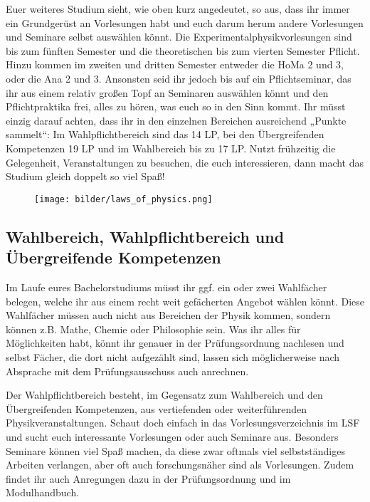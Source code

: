 Euer weiteres Studium sieht, wie oben kurz angedeutet, so aus, dass ihr immer ein Grundgerüst an Vorlesungen habt und euch darum herum andere Vorlesungen und Seminare selbst auswählen könnt. Die Experimentalphysikvorlesungen sind bis zum fünften Semester und die theoretischen bis zum vierten Semester Pflicht. Hinzu kommen im zweiten und dritten Semester entweder die \gls{HoMa} 2 und 3, oder die \gls{Ana} 2 und 3. Ansonsten seid ihr jedoch bis auf ein Pflichtseminar, das ihr aus einem relativ großen Topf an Seminaren auswählen könnt und den Pflichtpraktika frei, alles zu hören, was euch so in den Sinn kommt. Ihr müsst einzig darauf achten, dass ihr in den einzelnen Bereichen ausreichend „Punkte sammelt“: Im Wahlpflichtbereich sind das 14 \gls{LP}, bei den Übergreifenden Kompetenzen 19 \gls{LP} und im Wahlbereich bis zu 17 \gls{LP}. Nutzt frühzeitig die Gelegenheit, Veranstaltungen zu besuchen, die euch interessieren, dann macht das Studium gleich doppelt so viel Spaß!

\begin{figure}[b]
	\centering
	\texttt{[image: bilder/laws\_of\_physics.png]}
\end{figure}
\vfill \eject

\subsection{Wahlbereich, Wahlpflichtbereich und \\Übergreifende Kompetenzen}

Im Laufe eures Bachelorstudiums müsst ihr ggf. ein oder zwei Wahlfächer belegen, welche ihr aus einem recht weit gefächerten Angebot wählen könnt. Diese Wahlfächer müssen auch nicht aus Bereichen der Physik kommen, sondern können z.B. Mathe, Chemie oder Philosophie sein. Was ihr alles für Möglichkeiten habt, könnt ihr genauer in der Prüfungsordnung nachlesen und selbst Fächer, die dort nicht aufgezählt sind, lassen sich möglicherweise nach Absprache mit dem Prüfungsausschuss auch anrechnen.

Der Wahlpflichtbereich besteht, im Gegensatz zum Wahlbereich und den Übergreifenden Kompetenzen, aus vertiefenden oder weiterführenden Physikveranstaltungen. Schaut doch einfach in das Vorlesungsverzeichnis im LSF und sucht euch interessante Vorlesungen oder auch Seminare aus. Besonders Seminare können viel Spaß machen, da diese zwar oftmals viel selbstständiges Arbeiten verlangen, aber oft auch forschungsnäher sind als Vorlesungen. Zudem findet ihr auch Anregungen dazu in der Prüfungsordnung und im Modulhandbuch.

